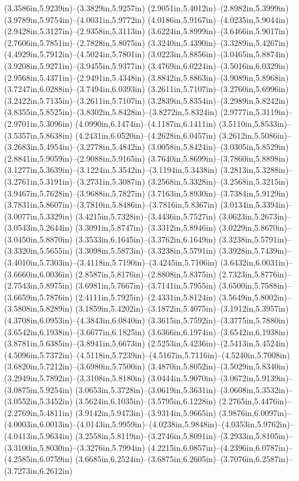 (3.3586in,5.9239in)--(3.3829in,5.9257in) (2.9051in,5.4012in)--(2.8982in,5.3999in) (3.9789in,5.9754in)--(4.0031in,5.9772in) (4.0186in,5.9167in)--(4.0235in,5.9044in) (2.9428in,5.3127in)--(2.9358in,5.3113in) (3.6224in,5.8999in)--(3.6466in,5.9017in) (2.7606in,5.7851in)--(2.7828in,5.8075in) (3.3240in,5.4390in)--(3.3289in,5.4267in) (4.4929in,5.7912in)--(4.5024in,5.7801in) (3.0223in,5.8856in)--(3.0465in,5.8874in) (3.9208in,5.9271in)--(3.9455in,5.9377in) (3.4769in,6.0224in)--(3.5016in,6.0329in) (2.9568in,5.4371in)--(2.9491in,5.4348in) (3.8842in,5.8863in)--(3.9089in,5.8968in) (3.7247in,6.0288in)--(3.7494in,6.0393in) (3.2611in,5.7107in)--(3.2760in,5.6996in) (3.2422in,5.7135in)--(3.2611in,5.7107in) (3.2839in,5.8354in)--(3.2989in,5.8242in) (3.8355in,5.8525in)--(3.8302in,5.8428in)--(3.8272in,5.8324in) (2.9777in,5.3119in)--(2.9701in,5.3096in) (4.0990in,6.1474in)--(4.1187in,6.1411in) (3.5110in,5.8533in)--(3.5357in,5.8638in) (4.2431in,6.0520in)--(4.2628in,6.0457in) (3.2612in,5.5086in)--(3.2683in,5.4954in)--(3.2778in,5.4842in) (3.0058in,5.8424in)--(3.0305in,5.8529in) (2.8841in,5.9059in)--(2.9088in,5.9165in) (3.7640in,5.8699in)--(3.7860in,5.8898in) (3.1277in,5.3639in)--(3.1224in,5.3542in)--(3.1194in,5.3438in) (3.2813in,5.3288in)--(3.2761in,5.3191in)--(3.2731in,5.3087in) (3.2568in,5.3328in)--(3.2568in,5.3215in) (3.9467in,5.7628in)--(3.9688in,5.7827in) (3.7163in,5.8930in)--(3.7384in,5.9129in) (3.7831in,5.8607in)--(3.7810in,5.8486in)--(3.7816in,5.8367in) (3.0134in,5.3394in)--(3.0077in,5.3329in) (3.4215in,5.7328in)--(3.4436in,5.7527in) (3.0623in,5.2673in)--(3.0543in,5.2644in) (3.3091in,5.8747in)--(3.3312in,5.8946in) (3.0229in,5.8670in)--(3.0450in,5.8870in) (3.3533in,6.1645in)--(3.3762in,6.1649in) (3.3238in,5.5791in)--(3.3320in,5.5655in) (3.3098in,5.5873in)--(3.3238in,5.5791in) (3.3928in,5.7439in)--(3.4010in,5.7303in)--(3.4118in,5.7190in)--(3.4245in,5.7106in) (3.6432in,6.0031in)--(3.6660in,6.0036in) (2.8587in,5.8176in)--(2.8808in,5.8375in) (2.7323in,5.8776in)--(2.7543in,5.8975in) (3.6981in,5.7667in)--(3.7141in,5.7955in) (3.6500in,5.7588in)--(3.6659in,5.7876in) (2.4111in,5.7925in)--(2.4331in,5.8124in) (3.5649in,5.8002in)--(3.5808in,5.8289in) (3.1859in,5.4202in)--(3.1872in,5.4075in)--(3.1912in,5.3957in) (4.3708in,6.0953in)--(4.3843in,6.0840in) (3.3615in,5.7592in)--(3.3775in,5.7880in) (3.6542in,6.1938in)--(3.6677in,6.1825in) (3.6366in,6.1974in)--(3.6542in,6.1938in) (3.8781in,5.6385in)--(3.8941in,5.6673in) (2.5253in,5.4236in)--(2.5413in,5.4524in) (4.5096in,5.7372in)--(4.5118in,5.7239in)--(4.5167in,5.7116in)--(4.5240in,5.7008in) (3.6820in,5.7212in)--(3.6980in,5.7500in) (3.4870in,5.8052in)--(3.5029in,5.8340in) (3.2949in,5.7892in)--(3.3108in,5.8180in) (3.0444in,5.9070in)--(3.0672in,5.9139in)--(3.0875in,5.9254in) (3.0653in,5.3728in)--(3.0619in,5.3631in)--(3.0608in,5.3532in)--(3.0552in,5.3452in) (3.5624in,6.1035in)--(3.5795in,6.1228in) (2.2765in,5.4476in)--(2.2769in,5.4811in) (3.9142in,5.9473in)--(3.9314in,5.9665in) (3.9876in,6.0097in)--(4.0003in,6.0013in)--(4.0143in,5.9959in)--(4.0238in,5.9848in)--(4.0353in,5.9762in)--(4.0413in,5.9634in) (3.2558in,5.8119in)--(3.2746in,5.8091in)--(3.2933in,5.8105in)--(3.3100in,5.8030in)--(3.3276in,5.7994in) (4.2215in,6.0857in)--(4.2396in,6.0787in)--(4.2585in,6.0759in) (3.6685in,6.2524in)--(3.6875in,6.2605in)--(3.7076in,6.2587in)--(3.7273in,6.2612in) 
